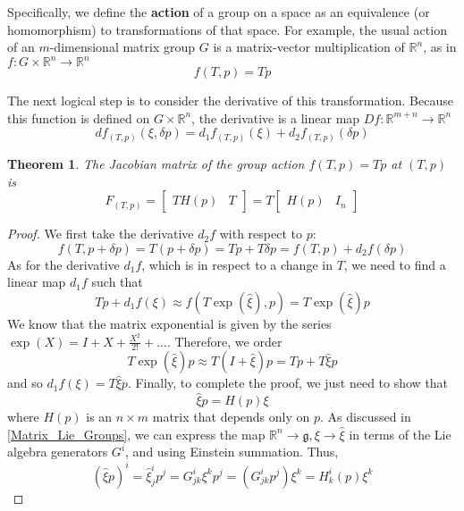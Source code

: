 \documentclass[reqno]{amsart}
\newtheorem{thm}{Theorem}[section]
\theoremstyle{definition}
\numberwithin{equation}{section}
\begin{document}
Specifically, we define the \textbf{action} of a group on a space as an equivalence (or homomorphism) to transformations of that space. For example, the usual action of an $m$-dimensional matrix group $G$ is a matrix-vector multiplication of $\mathbb{R}^n$, as in $f : G \times \mathbb{R}^n \to \mathbb{R}^n$
\begin{equation*}
    f(T, p) = Tp
\end{equation*}

The next logical step is to consider the derivative of this transformation. Because this function is defined on $G \times \mathbb{R}^n$, the derivative is a linear map $Df: \mathbb{R}^{m + n} \to \mathbb{R}^n$
\begin{equation*}
    df_{(T, p)}(\xi, \delta{p}) = d_1f_{(T, p)}(\xi) + d_2f_{(T, p)}(\delta{p})
\end{equation*}

\begin{thm}
    The Jacobian matrix of the group action $f(T, p) = Tp$ at $(T, p)$ is
    \begin{equation*}
        F_{(T, p)} = \begin{bmatrix} TH(p) & T\end{bmatrix} = T\begin{bmatrix} H(p) & I_n \end{bmatrix}
    \end{equation*}
\end{thm}

\begin{proof}
    We first take the derivative $d_2f$ with respect to $p$:
    \begin{equation*}
        f(T, p + \delta{p}) = T(p + \delta{p}) = Tp + T\delta{p} = f(T, p) + d_2f(\delta{p})
    \end{equation*}
    As for the derivative $d_1f$, which is in respect to a change in $T$, we need to find a linear map $d_1f$ such that
    \begin{equation*}
        Tp + d_1f(\xi) \approx f(T\exp(\hat\xi), p) = T\exp(\hat\xi)p
    \end{equation*}
    We know that the matrix exponential is given by the series $\exp(X) = I + X + \frac{X^2}{2!} + ...$. Therefore, we order
    \begin{equation*}
        T\exp(\hat\xi)p \approx T(I + \hat\xi)p = Tp + T\hat\xi{p}
    \end{equation*}
    and so $d_1f(\xi) = T\hat\xi p$. Finally, to complete the proof, we just need to show that
    \begin{equation*}
        \hat\xi p = H(p)\xi
    \end{equation*}
    where $H(p)$ is an $n \times m$ matrix that depends only on $p$. As discussed in \ref{Matrix_Lie_Groups}, we can express the map $\mathbb{R}^n \to \mathfrak{g}, \xi \to \hat\xi$ in terms of the Lie algebra generators $G^i$, and using Einstein summation. Thus,
    \begin{equation*}
        (\hat\xi p)^i = \hat\xi_j^ip^j = G^i_{jk}\xi^kp^j = (G^i_{jk}p^j)\xi^k = H^i_k(p)\xi^k
    \end{equation*}
\end{proof}
\end{document}

